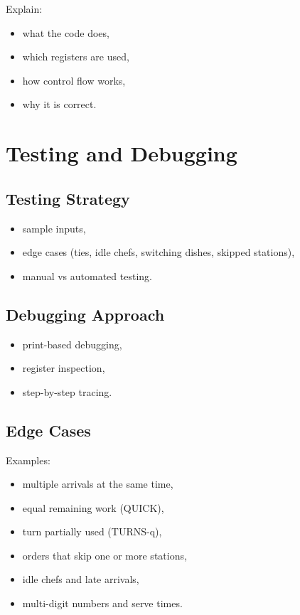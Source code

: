 \documentclass[a4paper,12pt]{article}
\begin{document}
Explain:
\begin{itemize}
\item what the code does,
\item which registers are used,
\item how control flow works,
\item why it is correct.
\end{itemize}

\section{Testing and Debugging}

\subsection{Testing Strategy}

\begin{itemize}
\item sample inputs,
\item edge cases (ties, idle chefs, switching dishes, skipped stations),
\item manual vs automated testing.
\end{itemize}

\subsection{Debugging Approach}

\begin{itemize}
\item print-based debugging,
\item register inspection,
\item step-by-step tracing.
\end{itemize}

\subsection{Edge Cases}

Examples:

\begin{itemize}
\item multiple arrivals at the same time,
\item equal remaining work (QUICK),
\item turn partially used (TURNS-q),
\item orders that skip one or more stations,
\item idle chefs and late arrivals,
\item multi-digit numbers and serve times.
\end{itemize}
\end{document}
